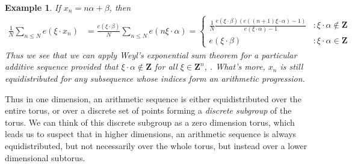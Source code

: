 \documentclass{report}
\theoremstyle{plain}
\newtheorem*{example}{Example}
\theoremstyle{plain}
\begin{document}
\begin{example}
    If $x_n = n \alpha + \beta$, then
    \begin{align*}
        \frac{1}{N} \sum_{n \leq N} e(\xi \cdot x_n) &= \frac{e(\xi \cdot \beta)}{N} \sum_{n \leq N} e(n \xi \cdot \alpha) = \begin{cases} \frac{1}{N} \frac{e(\xi \cdot \beta)(e((n+1) \xi \cdot \alpha) - 1)}{e(\xi \cdot \alpha) - 1} & : \xi \cdot \alpha \not \in \mathbf{Z} \\ e(\xi \cdot \beta) & : \xi \cdot \alpha \in \mathbf{Z} \end{cases}
    \end{align*}
    Thus we see that we can apply Weyl's exponential sum theorem for a particular additive sequence provided that $\xi \cdot \alpha \not \in \mathbf{Z}$ for all $\xi \in \mathbf{Z}^n$, . What's more, $x_n$ is still equidistributed for any subsequence whose indices form an arithmetic progression.
\end{example}

Thus in one dimension, an arithmetic sequence is either equidistributed over the entire torus, or over a discrete set of points forming a {\it discrete subgroup} of the torus. We can think of this discrete subgroup as a zero dimension torus, which leads us to suspect that in higher dimensions, an arithmetic sequence is always equidistributed, but not necessarily over the whole torus, but instead over a lower dimensional subtorus.
\end{document}
